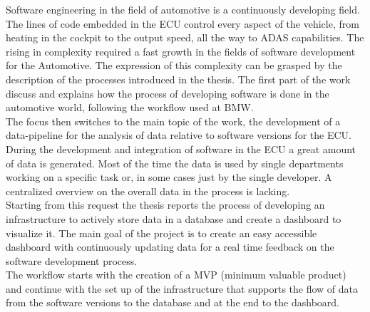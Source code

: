 \documentclass[../main.tex]{subfiles}
\begin{document}
Software engineering in the field of automotive is a continuously developing field. The lines of code embedded in the \gls{ECU} control every aspect of the vehicle, from heating in the cockpit to the output speed, all the way to \gls{ADAS} capabilities. The rising in complexity required a fast growth in the fields of software development for the Automotive. The expression of this complexity can be grasped by the description of the processes introduced in the thesis. The first part of the work discuss and explains how the process of developing software is done in the automotive world, following the workflow used at \gls{BMW}.\\
The focus then switches to the main topic of the work, the development of a data-pipeline for the analysis of data relative to software versions for the \gls{ECU}. During the development and integration of software in the \gls{ECU} a great amount of data is generated. Most of the time the data is used by single departments working on a specific task or, in some cases just by the single developer. A centralized overview on the overall data in the process is lacking.\\
Starting from this request the thesis reports the process of developing an infrastructure to actively store data in a database and create a dashboard to visualize it. The main goal of the project is to create an easy accessible dashboard with continuously updating data for a real time feedback on the software development process.\\
The workflow starts with the creation of a MVP (minimum valuable product) and continue with the set up of the infrastructure that supports the flow of data from the software versions to the database and at the end to the dashboard.\\

\cleardoublepage
\end{document}
